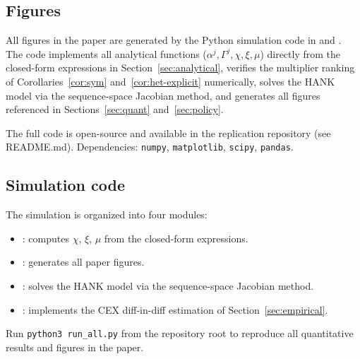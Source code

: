 \subsection{Figures}\label{app:figures}

All figures in the paper are generated by the Python simulation code in
 and
. The code implements all analytical
functions ($\alpha^{j},\Gamma^{j},\chi,\xi,\mu$) directly from the closed-form
expressions in Section~\ref{sec:analytical}, verifies the multiplier ranking
of Corollaries~\ref{cor:sym} and~\ref{cor:het-explicit} numerically, solves
the HANK model via the sequence-space Jacobian method, and generates all
figures referenced in Sections~\ref{sec:quant} and~\ref{sec:policy}.

The full code is open-source and available in the replication repository
(see README.md). Dependencies: \texttt{numpy}, \texttt{matplotlib},
\texttt{scipy}, \texttt{pandas}.

\subsection{Simulation code}\label{app:sim-code}

The simulation is organized into four modules:
\begin{itemize}[leftmargin=1.6em]
  \item {}: computes $\chi$, $\xi$, $\mu$
    from the closed-form expressions.
  \item {}: generates all paper figures.
  \item {}: solves the HANK model via the
    sequence-space Jacobian method.
  \item {}: implements the CEX
    diff-in-diff estimation of Section~\ref{sec:empirical}.
\end{itemize}

Run \texttt{python3 run\_all.py} from the repository root to reproduce all
quantitative results and figures in the paper.

